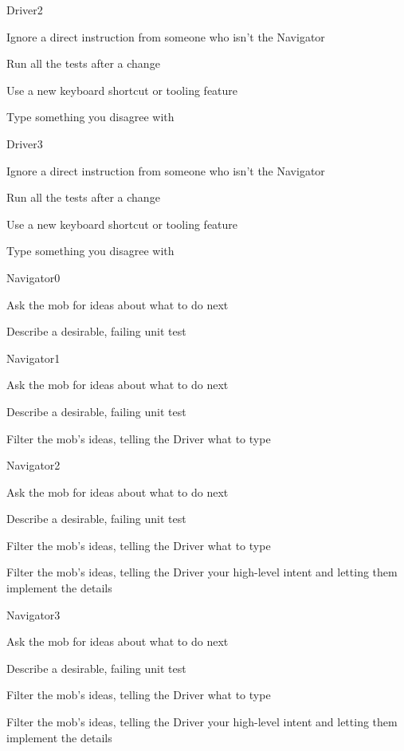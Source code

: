 \documentclass[20pt]{extarticle}
\begin{document}
\begin{role}{Driver}{2}
  \item Ignore a direct instruction from someone who isn't the Navigator
  \item Run all the tests after a change
  \item Use a new keyboard shortcut or tooling feature
  \item Type something you disagree with
\end{role}

\begin{role}{Driver}{3}
  \item Ignore a direct instruction from someone who isn't the Navigator
  \item Run all the tests after a change
  \item Use a new keyboard shortcut or tooling feature
  \item Type something you disagree with
\end{role}


\begin{role}{Navigator}{0}
  \item Ask the mob for ideas about what to do next
  \item Describe a desirable, failing unit test
\end{role}

\begin{role}{Navigator}{1}
  \item Ask the mob for ideas about what to do next
  \item Describe a desirable, failing unit test
  \item Filter the mob's ideas, telling the Driver what to type
\end{role}

\begin{role}{Navigator}{2}
  \item Ask the mob for ideas about what to do next
  \item Describe a desirable, failing unit test
  \item Filter the mob's ideas, telling the Driver what to type
  \item Filter the mob's ideas, telling the Driver your high-level
    intent and letting them implement the details
\end{role}

\begin{role}{Navigator}{3}
  \item Ask the mob for ideas about what to do next
  \item Describe a desirable, failing unit test
  \item Filter the mob's ideas, telling the Driver what to type
  \item Filter the mob's ideas, telling the Driver your high-level
    intent and letting them implement the details
\end{role}
\end{document}

